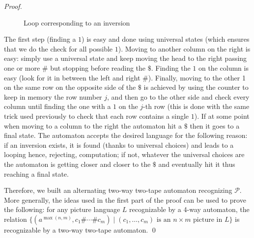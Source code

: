 \documentclass[runningheads, envcountsame, a4paper]{llncs}
\newcommand*{\perm}{\mathcal{P}}
\newcommand*{\separator}{\$}
\newcommand*{\model}{two-way two-tape automaton\xspace}
\newcommand*{\amodel}{alternating two-way two-tape automaton\xspace}
\begin{document}
\begin{proof}
\begin{figure}[ht]
 \centering
{}
\caption{Loop corresponding to an inversion}
  \label{inversion}
\end{figure}

The first step (finding a $1$) is easy and done using universal states
(which ensures that we do the check for all possible $1$). Moving to
another column on the right is easy: simply use a universal state and keep
moving the head to the right passing one or more $\#$ but stopping before
reading the $\separator$. Finding the $1$ on the column is easy (look for it in
between the left and right $\#$). Finally, moving to the other 1 on the
same row on the opposite side of the $\separator$ is achieved by using the counter
to keep in memory the row number $j$, and then go to the other side and
check every column until finding the one with a $1$ on the $j$-th row (this
is done with the same trick used previously to check that each row contains
a single $1$). 
If at some point when moving to a column to the right the automaton hit a $\separator$ then it goes to a final state. The automaton accepts the desired language for the following reason: if an inversion exists, it is found (thanks to universal choices) and leads to a looping hence, rejecting, computation; if not, whatever the universal choices are the automaton is getting closer and closer to the $\separator$ and eventually hit it thus  reaching a final state.

Therefore, we built an \amodel recognizing $\perm$. More generally, the ideas used in the first part of the proof can be used to prove the following: for any picture language $L$ recognizable by a 4-way automaton, the relation $\{(a^{\max(n,m)},c_1\#\cdots\#c_m)\mid (c_1,\dots,c_m) \text{ is an $n\times m$ picture in $L$}\}$ is recognizable by a \model.
\qed\end{proof}
\end{document}

